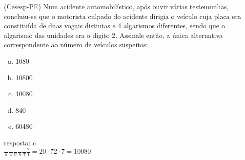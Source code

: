 \begin{ex}
  (Cesesp-PE) Num acidente automobilístico, após ouvir várias testemunhas, concluiu-se que o motorista culpado do acidente dirigia o veículo cuja placa era constituída de duas vogais distintas e 4 algarismos diferentes, sendo que o algarismo das unidades era o dígito 2. Assinale então, a única alternativa correspondente ao número de veículos suspeitos:
    \begin{enumerate}[(a)]
    \item 1080
    \item 10800
    \item 10080
    \item 840
    \item 60480
    \end{enumerate}
      \begin{sol}
        resposta: c \\
        $\frac{\phantom{A}}{5}\frac{\phantom{A}}{4}\frac{\phantom{A}}{9}\frac{\phantom{A}}{8}\frac{\phantom{A}}{7}\frac{2}{1}=20\cdot72\cdot7=10080$
      \end{sol}
\end{ex}